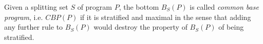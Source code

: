 \begin{definition}
\label{def:prelims-asp-semantics-cbp}
Given a splitting set $S$ of program $P$, the bottom $B_S(P)$ is called \emph{common base program}, i.e. $CBP(P)$ if it is stratified and maximal in the sense that adding any further rule to $B_S(P)$ would destroy the property of $B_S(P)$ of being stratified.
\end{definition}

